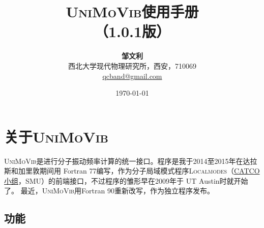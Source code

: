 \documentclass[12pt,a4paper,openany,twoside,cap]{ctexbook}
\begin{document}

\title{\vspace{-2cm}
\hei\textsc{UniMoVib}使用手册  \\ \vspace{1cm}
（1.0.1版） \vspace{8cm}}

\author{
\textbf{邹文利} \\ \vspace{5mm}
西北大学现代物理研究所，西安，710069 \\ \vspace{5mm}
\href{mailto:qcband@gmail.com}{qcband@gmail.com}
}

\date{\vspace{4cm}  \today}
\maketitle

\setcounter{page}{1}   %
\renewcommand\contentsname{目\qquad 录}
\makeatletter
\let\ps@plain\ps@empty
\makeatother
\tableofcontents            %

\mainmatter
\chapter{关于\textsc{UniMoVib}}
\label{part:about}

\textsc{UniMoVib}是进行分子振动频率计算的统一接口。程序是我于2014至2015年在达拉斯和加里敦期间用 Fortran 77编写，作为分子局域模式程序\textsc{Localmodes}（\href{https://sites.smu.edu/dedman/catco/}{CATCO小组}，SMU）的前端接口，不过程序的雏形早在2009年于 UT Austin时就开始了。
最近，\textsc{UniMoVib}用Fortran 90重新改写，作为独立程序发布。

\section{功能} \label{sec:feature}
\end{document}
